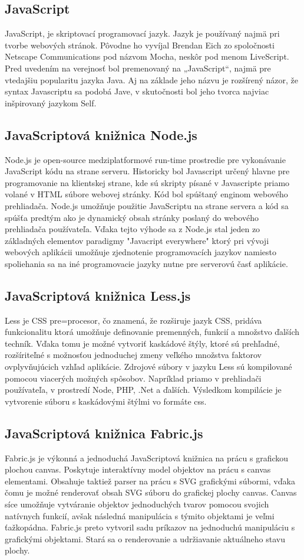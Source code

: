 \subsection{JavaScript}
JavaScript, je skriptovací programovací jazyk. Jazyk je používaný najmä pri tvorbe webových stránok. Pôvodne ho vyvíjal Brendan Eich zo spoločnosti Netscape Communications pod názvom Mocha, neskôr pod menom LiveScript. Pred uvedením na verejnosť bol premenovaný na „JavaScript“, najmä pre vtedajšiu popularitu jazyka Java. Aj na základe jeho názvu je rozšírený názor, že syntax Javascriptu sa podobá Jave, v skutočnosti bol jeho tvorca najviac inšpirovaný jazykom Self.

\subsection{JavaScriptová knižnica Node.js}
Node.js je open-source medziplatformové run-time prostredie pre vykonávanie JavaScript kódu na strane serveru. Historicky bol Javascript určený hlavne pre programovanie na klientskej strane, kde sú skripty písané v Javascripte priamo volané v HTML súbore webovej stránky. Kód bol spúštaný enginom webového prehliadača. Node.js umožňuje použitie JavaScriptu na strane servera a kód sa spúšťa predtým ako je dynamický obsah stránky poslaný do webového prehliadača používateľa. Vďaka tejto výhode sa z Node.js stal jeden zo základných elementov paradigmy "Javacript everywhere" ktorý pri vývoji webových aplikácii umožňuje zjednotenie programovacích jazykov namiesto spoliehania sa na iné programovacie jazyky nutne pre serverovú časť aplikácie.

\subsection{JavaScriptová knižnica Less.js}
Less je CSS pre=procesor, čo znamená, že rozširuje jazyk CSS, pridáva funkcionalitu ktorá umožňuje definovanie premenných, funkcií a množstvo ďalších techník. Vďaka tomu je možné vytvoriť kaskádové štýly, ktoré sú prehľadné, rozšíriteľné s možnosťou jednoduchej zmeny veľkého množstva faktorov ovplyvňujúcich vzhľad aplikácie. Zdrojové súbory v jazyku Less sú kompilované pomocou viacerých možných spôsobov. Napríklad priamo v prehliadači používateľa, v prostredí Node, PHP, .Net a ďalších. Výsledkom kompilácie je vytvorenie súboru s kaskádovými štýlmi vo formáte css.
 
\subsection{JavaScriptová knižnica Fabric.js}
Fabric.js je výkonná a jednoduchá JavaScriptová knižnica na prácu s grafickou plochou canvas. Poskytuje interaktívny model objektov na prácu s canvas elementami. Obsahuje taktiež parser na prácu s SVG grafickými súbormi, vďaka čomu je možné renderovať obsah SVG súboru do grafickej plochy canvas. Canvas síce umožňuje vytváranie objektov jednoduchých tvarov pomocou svojich natívnych funkcií, avšak následná manipulácia s týmito objektami je veľmi ťažkopádna. Fabric.js preto vytvoril sadu príkazov na jednoduchú manipuláciu s grafickými objektami. Stará sa o renderovanie a udržiavanie aktuálneho stavu plochy. 

